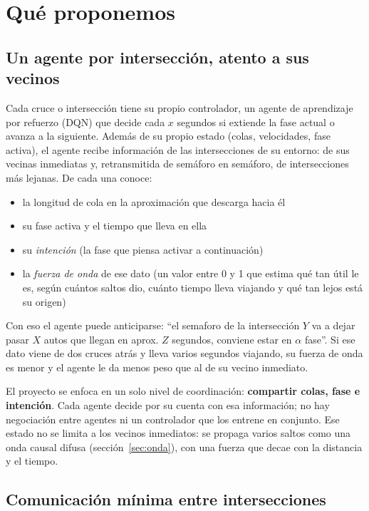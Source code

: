 \documentclass[11pt,letterpaper]{article}
\begin{document}
\section{Qué proponemos}

\subsection{Un agente por intersección, atento a sus vecinos}

Cada cruce o intersección tiene su propio controlador, un agente de aprendizaje por
refuerzo (DQN) que decide cada $x$ segundos si extiende la fase actual o avanza a
la siguiente. Además de su propio estado (colas, velocidades, fase activa), el
agente recibe información de las intersecciones de su entorno: de sus vecinas
inmediatas y, retransmitida de semáforo en semáforo, de intersecciones más lejanas. De
cada una conoce:

\begin{itemize}
  \item la longitud de cola en la aproximación que descarga hacia él
  \item su fase activa y el tiempo que lleva en ella
  \item su \emph{intención} (la fase que piensa activar a continuación)
  \item la \emph{fuerza de onda} de ese dato (un valor entre 0 y 1 que estima qué
        tan útil le es, según cuántos saltos dio, cuánto tiempo lleva viajando y
        qué tan lejos está su origen)
\end{itemize}

Con eso el agente puede anticiparse: ``el semaforo de la intersección $Y$ va a dejar 
pasar $X$ autos que llegan en aprox. $Z$ segundos, conviene estar en $\alpha$ fase''. Si ese
dato viene de dos cruces atrás y lleva varios segundos viajando, su fuerza de onda
es menor y el agente le da menos peso que al de su vecino inmediato.

El proyecto se enfoca en un solo nivel de coordinación: \textbf{compartir colas,
fase e intención}. Cada agente decide por su cuenta con esa información; no hay
negociación entre agentes ni un controlador que los entrene en conjunto. Ese
estado no se limita a los vecinos inmediatos: se propaga varios saltos como una
onda causal difusa (sección~\ref{sec:onda}), con una fuerza que decae con la
distancia y el tiempo.

\subsection{Comunicación mínima entre intersecciones}
\end{document}

